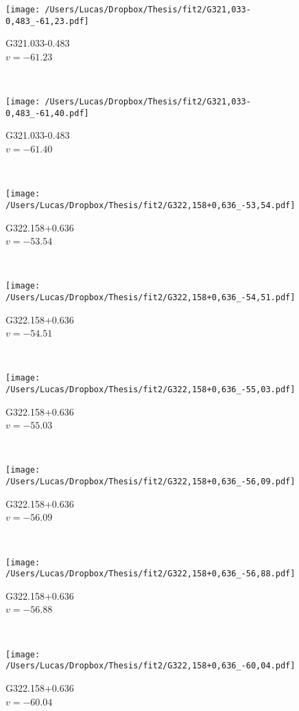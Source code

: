 \begin{figure*}[t]\ContinuedFloat
	\centering
	\begin{subfigure}[t]{0.3\textwidth}
		\texttt{[image: /Users/Lucas/Dropbox/Thesis/fit2/G321,033-0,483\_-61,23.pdf]}
		\caption[]{G321.033-0.483\\$v=-61.23$\,\kms}
	\end{subfigure}
	~
	\begin{subfigure}[t]{0.3\textwidth}
		\texttt{[image: /Users/Lucas/Dropbox/Thesis/fit2/G321,033-0,483\_-61,40.pdf]}
		\caption[]{G321.033-0.483\\$v=-61.40$\,\kms}
	\end{subfigure}
	~
	\begin{subfigure}[t]{0.3\textwidth}
		\texttt{[image: /Users/Lucas/Dropbox/Thesis/fit2/G322,158+0,636\_-53,54.pdf]}
		\caption[]{G322.158+0.636\\$v=-53.54$\,\kms}
	\end{subfigure}
	~
	\begin{subfigure}[t]{0.3\textwidth}
		\texttt{[image: /Users/Lucas/Dropbox/Thesis/fit2/G322,158+0,636\_-54,51.pdf]}
		\caption[]{G322.158+0.636\\$v=-54.51$\,\kms}
	\end{subfigure}
	~
	\begin{subfigure}[t]{0.3\textwidth}
		\texttt{[image: /Users/Lucas/Dropbox/Thesis/fit2/G322,158+0,636\_-55,03.pdf]}
		\caption[]{G322.158+0.636\\$v=-55.03$\,\kms}
	\end{subfigure}
	~
	\begin{subfigure}[t]{0.3\textwidth}
		\texttt{[image: /Users/Lucas/Dropbox/Thesis/fit2/G322,158+0,636\_-56,09.pdf]}
		\caption[]{G322.158+0.636\\$v=-56.09$\,\kms}
	\end{subfigure}
	~
	\begin{subfigure}[t]{0.3\textwidth}
		\texttt{[image: /Users/Lucas/Dropbox/Thesis/fit2/G322,158+0,636\_-56,88.pdf]}
		\caption[]{G322.158+0.636\\$v=-56.88$\,\kms}
	\end{subfigure}
	~
	\begin{subfigure}[t]{0.3\textwidth}
		\texttt{[image: /Users/Lucas/Dropbox/Thesis/fit2/G322,158+0,636\_-60,04.pdf]}
		\caption[]{G322.158+0.636\\$v=-60.04$\,\kms}

\end{subfigure}
\end{figure*}
